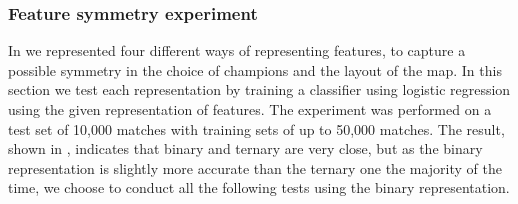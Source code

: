 \subsubsection{Feature symmetry experiment}
In  we represented four different ways of representing features, to capture a possible symmetry in the choice of champions and the layout of the map. In this section we test each representation by training a classifier using logistic regression using the given representation of features. The experiment was performed on a test set of 10,000 matches with training sets of up to 50,000 matches. The result, shown in , indicates that binary and ternary are very close, but as the binary representation is slightly more accurate than the ternary one the majority of the time, we choose to conduct all the following tests using the binary representation. 

